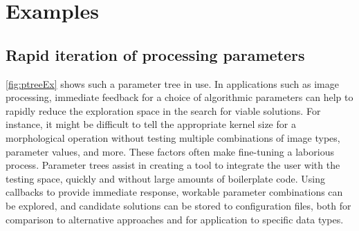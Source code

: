 



\section{Examples}\label{sec:examples}

\subsection{Rapid iteration of processing parameters}

\autoref{fig:ptreeEx} shows such a parameter tree in use. In applications such as image processing, immediate feedback for a choice of algorithmic parameters can help to rapidly reduce the exploration space in the search for viable solutions. For instance, it might be difficult to tell the appropriate kernel size for a morphological operation without testing multiple combinations of image types, parameter values, and more. These factors often make fine-tuning a laborious process. Parameter trees assist in creating a tool to integrate the user with the testing space, quickly and without large amounts of boilerplate code. Using callbacks to provide immediate response, workable parameter combinations can be explored, and candidate solutions can be stored to configuration files, both for comparison to alternative approaches and for application to specific data types.
\makePtreeExFig

